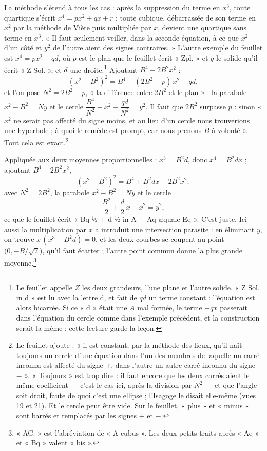 \documentclass[11pt,a4paper]{article}
\begin{document}
La méthode s'étend à tous les cas : après la suppression du terme en $x^3$,
toute quartique s'écrit $x^4 = px^2 + qx + r$ ; toute cubique, débarrassée de
son terme en $x^2$ par la méthode de Viète puis multipliée par $x$, devient une
quartique sans terme en $x^3$. « Il faut seulement veiller, dans la seconde
équation, à ce que $x^2$ d'un côté et $y^2$ de l'autre aient des signes
contraires. » L'autre exemple du feuillet est $x^4 = px^2 - qd$, où $p$ est le
plan que le feuillet écrit « Zpl. » et $q$ le solide qu'il écrit « Z Sol. », et
$d$ une droite.\footnote{Le feuillet appelle $Z$ les deux grandeurs, l'une plane
et l'autre solide. « Z Sol. in d » est lu avec la lettre d, et fait de $qd$ un
terme constant : l'équation est alors bicarrée. Si ce « d » était une $A$ mal
formée, le terme $-qx$ passerait dans l'équation du cercle comme dans l'exemple
précédent, et la construction serait la même ; cette lecture garde la leçon.}
Ajoutant $B^4 - 2B^2x^2$ :
\[ (x^2 - B^2)^2 = B^4 - (2B^2 - p)\,x^2 - qd , \]
et l'on pose $N^2 = 2B^2 - p$, « la différence entre $2B^2$ et le plan » : la
parabole $x^2 - B^2 = Ny$ et le cercle
$\dfrac{B^4}{N^2} - x^2 - \dfrac{qd}{N^2} = y^2$. Il faut que $2B^2$ surpasse
$p$ : sinon « $x^2$ ne serait pas affecté du signe moins, et au lieu d'un cercle
nous trouverions une hyperbole ; à quoi le remède est prompt, car nous prenons
$B$ à volonté ». Tout cela est exact.\footnote{Le feuillet ajoute : « il est
constant, par la méthode des lieux, qu'il naît toujours un cercle d'une
équation dans l'un des membres de laquelle un carré inconnu est affecté du signe
$+$, dans l'autre un autre carré inconnu du signe $-$ ». « Toujours » est trop
dire : il faut encore que les deux carrés aient le même coefficient — c'est le
cas ici, après la division par $N^2$ — et que l'angle soit droit, faute de quoi
c'est une ellipse ; l'Isagoge le disait elle-même (vues 19 et 21). Et le cercle
peut être vide. Sur le feuillet, « plus » et « minus » sont barrés et remplacés
par les signes $+$ et $-$.}

Appliquée aux deux moyennes proportionnelles : $x^3 = B^2d$, donc
$x^4 = B^2dx$ ; ajoutant $B^4 - 2B^2x^2$,
\[ (x^2 - B^2)^2 = B^4 + B^2dx - 2B^2x^2 ; \]
avec $N^2 = 2B^2$, la parabole $x^2 - B^2 = Ny$ et le cercle
\[ \frac{B^2}{2} + \frac{d}{2}\,x - x^2 = y^2 , \]
ce que le feuillet écrit « Bq ½ $+$ d ½ in A $-$ Aq æquale Eq ». C'est juste.
Ici aussi la multiplication par $x$ a introduit une intersection parasite :
en éliminant $y$, on trouve $x\,(x^3 - B^2d) = 0$, et les deux courbes se
coupent au point $\bigl(0, -B/\sqrt2\bigr)$, qu'il faut écarter ; l'autre point
commun donne la plus grande moyenne.\footnote{« AC. » est l'abréviation de « A
cubus ». Les deux petits traits après « Aq » et « Bq » valent « bis ».}
\end{document}
